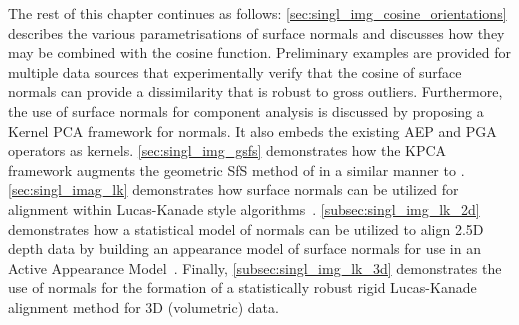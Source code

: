 The rest of this chapter continues as follows:
\cref{sec:singl_img_cosine_orientations} describes the various
parametrisations of surface normals and discusses how they may be combined with
the cosine function. Preliminary examples are provided for multiple
data sources that experimentally verify that the cosine of surface normals
can provide a dissimilarity that is robust to gross outliers. Furthermore,
the use of surface normals for component analysis is discussed by proposing a
Kernel PCA framework for normals. It also embeds the existing AEP and PGA
operators as kernels.
\cref{sec:singl_img_gsfs} demonstrates how the KPCA framework augments
the geometric SfS method of \citet{worthington1999new} in a similar manner to
\citet{smith2006recovering}.
\cref{sec:singl_imag_lk} demonstrates how surface
normals can be utilized for alignment within Lucas-Kanade style
algorithms~\cite{lucas1981iterative}.
\cref{subsec:singl_img_lk_2d} demonstrates how a statistical model of normals
can be utilized to align 2.5D depth data by building an appearance model of
surface normals for use in an Active Appearance Model~\cite{cootes2001active}.
Finally, \cref{subsec:singl_img_lk_3d} demonstrates the use of normals for the
formation of a statistically robust rigid Lucas-Kanade~\cite{lucas1981iterative}
alignment method for 3D (volumetric) data.
{






}
\stopcontents[chapters]
